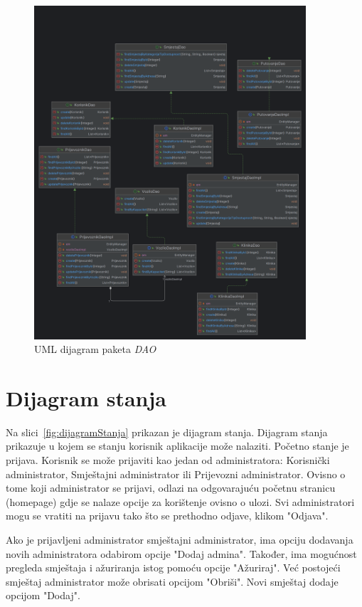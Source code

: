 			\begin{figure}[htbp]
				\centering
				\includegraphics[width=0.9\textwidth]{slike/dao}
				\caption{UML dijagram paketa \textit{DAO}}
				\label{fig:dao}
			\end{figure}
			
			\eject
		
		\section{Dijagram stanja}
			
			
			Na slici~\ref{fig:dijagramStanja} prikazan je dijagram stanja. Dijagram stanja prikazuje u kojem se stanju korisnik aplikacije može nalaziti. Početno stanje je prijava. Korisnik se može prijaviti kao jedan od administratora: Korisnički administrator, Smještajni administrator ili Prijevozni administrator. Ovisno o tome koji administrator se prijavi, odlazi na odgovarajuću početnu stranicu (homepage) gdje se nalaze opcije za korištenje ovisno o ulozi. Svi administratori mogu se vratiti na prijavu tako što se prethodno odjave, klikom "Odjava".
			
			Ako je prijavljeni administrator smještajni administrator, ima opciju dodavanja novih administratora odabirom opcije "Dodaj admina". Također, ima mogućnost pregleda smještaja i ažuriranja istog pomoću opcije "Ažuriraj". Već postojeći smještaj administrator može obrisati opcijom "Obriši". Novi smještaj dodaje opcijom "Dodaj".
			
